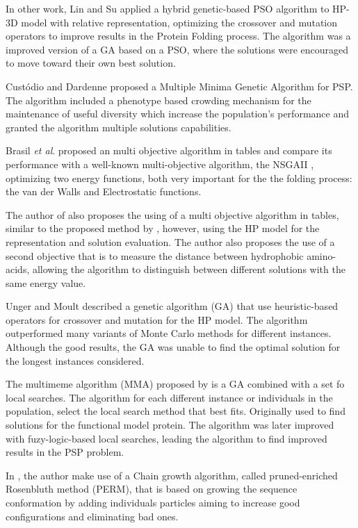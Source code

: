 In other work, Lin and Su \cite{lin2011protein} applied a hybrid genetic-based PSO algorithm to HP-3D model with relative representation, optimizing the crossover and mutation operators to improve results in the Protein Folding process. The algorithm was a improved version of a GA based on a PSO, where the solutions were encouraged to move toward their own best solution.


Cust\'{o}dio and Dardenne \cite{custodio2014multiple} proposed a Multiple Minima Genetic Algorithm for PSP. The algorithm included a phenotype based crowding mechanism for the maintenance of useful diversity which increase the population's performance and granted the algorithm multiple solutions capabilities.


Brasil \textit{et al}.\cite{soares2011investigating} proposed an multi objective algorithm in tables and compare its performance with a well-known multi-objective algorithm, the NSGAII \cite{deb2002fast}, optimizing two energy functions, both very important for the the folding process: the van der Walls and Electrostatic functions.


The author of \cite{gabriel2012algoritmos} also proposes the using of a multi objective algorithm in tables, similar to the proposed method by \cite{soares2011investigating}, however, using the HP model for the representation and solution evaluation. The author also proposes the use of a second objective that is to measure the distance between hydrophobic amino-acids, allowing the algorithm to distinguish between different solutions with the same energy value.


Unger and Moult \cite{unger1993genetic} described a genetic algorithm (GA) that use heuristic-based operators for crossover and mutation for the HP model. The algorithm outperformed many variants of Monte Carlo methods for different instances. Although the good results, the GA was unable to find the optimal solution for the longest instances considered.


The multimeme algorithm (MMA) proposed by \cite{krasnogor2002multimeme} is a GA combined with a set fo local searches. The algorithm for each different instance or individuals in the population, select the local search method that best fits. Originally used to find solutions for the functional model protein. The algorithm was later improved with fuzy-logic-based local searches, leading the algorithm to find improved results in the PSP problem.


In \cite{hsu2003growth}, the author make use of a Chain growth algorithm, called pruned-enriched Rosenbluth method (PERM), that is based on growing the sequence conformation by adding individuals particles aiming to increase good configurations and eliminating bad ones.


